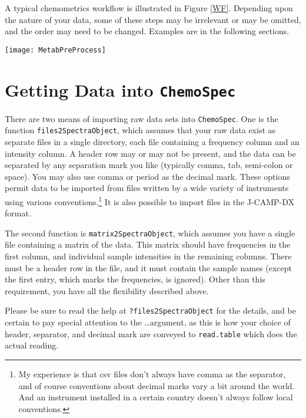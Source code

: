 \documentclass[letter,10pt,twocolumn,twoside,printwatermark=false]{pinp}
\begin{document}
A typical chemometrics workflow is illustrated in Figure \ref{WF}.
Depending upon the nature of your data, some of these steps may be
irrelevant or may be omitted, and the order may need to be changed.
Examples are in the following sections.

\begin{figure*}
\texttt{[image: MetabPreProcess]}
\caption{\label{WF}A typical workflow.  For a given data set, some steps may be omitted and the order changed.  That is part of what is meant by exploratory data analysis!}
\end{figure*}

\hypertarget{getting-data-into}{%
\section{\texorpdfstring{Getting Data into
\texttt{ChemoSpec}}{Getting Data into }}\label{getting-data-into}}

There are two means of importing raw data sets into \texttt{ChemoSpec}.
One is the function \texttt{files2SpectraObject}, which assumes that
your raw data exist as separate files in a single directory, each file
containing a frequency column and an intensity column. A header row may
or may not be present, and the data can be separated by any separation
mark you like (typically comma, tab, semi-colon or space). You may also
use comma or period as the decimal mark. These options permit data to be
imported from files written by a wide variety of instruments using
various
conventions.\footnote{My experience is that csv files don't always have comma as the separator, and of course conventions about decimal marks vary a bit around the world.  And an instrument installed in a certain country doesn't always follow local conventions.}
It is also possible to import files in the J-CAMP-DX format.

The second function is \texttt{matrix2SpectraObject}, which assumes you
have a single file containing a matrix of the data. This matrix should
have frequencies in the first column, and individual sample intensities
in the remaining columns. There must be a header row in the file, and it
must contain the sample names (except the first entry, which marks the
frequencies, is ignored). Other than this requirement, you have all the
flexibility described above.

Please be sure to read the help at \texttt{?files2SpectraObject} for the
details, and be certain to pay special attention to the \ldots argument,
as this is how your choice of header, separator, and decimal mark are
conveyed to \texttt{read.table} which does the actual reading.
\end{document}
